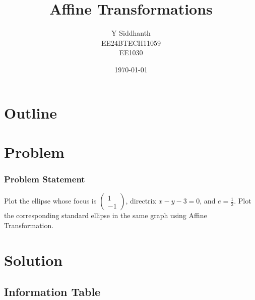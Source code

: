 \documentclass{beamer}
\title{Affine Transformations}
\author{Y Siddhanth \\ EE24BTECH11059\\ EE1030}
\date{\today}
\theoremstyle{remark}
\newcommand{\myvec}[1]{\ensuremath{\begin{pmatrix}#1\end{pmatrix}}}
\numberwithin{equation}{section}
\begin{document}
\begin{frame}
\titlepage
\end{frame}

\section*{Outline}
\begin{frame}
\tableofcontents
\end{frame}
\section{Problem}
\begin{frame}
\frametitle{Problem Statement}
Plot the ellipse whose focus is $\myvec{1 \\ -1}$, directrix $x-y-3 = 0$, and $e = \frac{1}{2}$. Plot the corresponding standard ellipse in the same graph using Affine Transformation.
\end{frame}

\section{Solution}
\subsection{Information Table}
\end{document}
